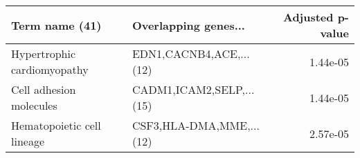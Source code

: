 \begin{tabular}{llr}
\toprule
             Term name (41) &     Overlapping genes... &  Adjusted p-value \\
\midrule
Hypertrophic cardiomyopathy &  EDN1,CACNB4,ACE,...(12) &          1.44e-05 \\
    Cell adhesion molecules & CADM1,ICAM2,SELP,...(15) &          1.44e-05 \\
 Hematopoietic cell lineage & CSF3,HLA-DMA,MME,...(12) &          2.57e-05 \\
\bottomrule
\end{tabular}
